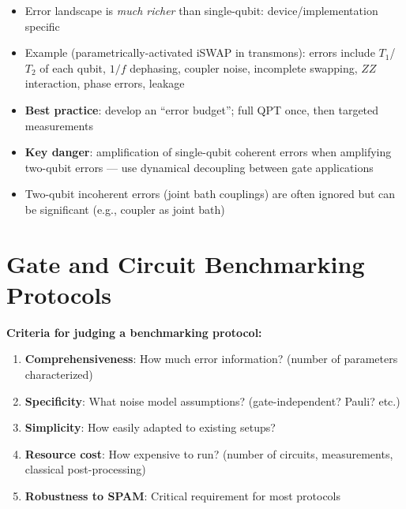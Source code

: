 \documentclass[10pt,a4paper]{article}
\begin{document}
\begin{itemize}
  \item Error landscape is \emph{much richer} than single-qubit: device/implementation specific
  \item Example (parametrically-activated iSWAP in transmons): errors include $T_1$/$T_2$ of each qubit, $1/f$ dephasing, coupler noise, incomplete swapping, $ZZ$ interaction, phase errors, leakage
  \item \textbf{Best practice}: develop an ``error budget''; full QPT once, then targeted measurements
  \item \textbf{Key danger}: amplification of single-qubit coherent errors when amplifying two-qubit errors --- use dynamical decoupling between gate applications
  \item Two-qubit incoherent errors (joint bath couplings) are often ignored but can be significant (e.g., coupler as joint bath)
\end{itemize}

\newpage

\section{Gate and Circuit Benchmarking Protocols}

\textbf{Criteria for judging a benchmarking protocol:}
\begin{enumerate}
  \item \textcolor{deepblue}{\textbf{Comprehensiveness}}: How much error information? (number of parameters characterized)
  \item \textcolor{deepblue}{\textbf{Specificity}}: What noise model assumptions? (gate-independent? Pauli? etc.)
  \item \textcolor{deepblue}{\textbf{Simplicity}}: How easily adapted to existing setups?
  \item \textcolor{deepblue}{\textbf{Resource cost}}: How expensive to run? (number of circuits, measurements, classical post-processing)
  \item \textcolor{deepblue}{\textbf{Robustness to SPAM}}: Critical requirement for most protocols
\end{enumerate}

\newpage

\end{document}
